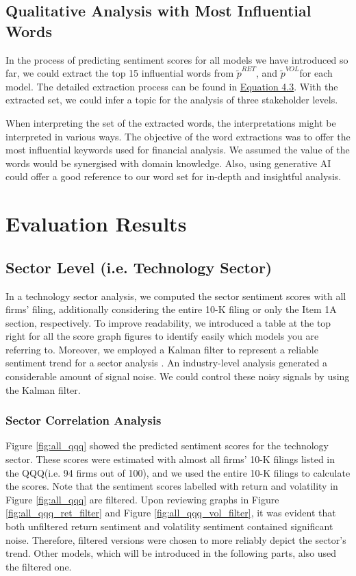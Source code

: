 \documentclass[logo,bsc,singlespacing,parskip]{infthesis}
\begin{document}
\subsection{Qualitative Analysis with Most Influential Words}
In the process of predicting sentiment scores for all models we have introduced so far, we could extract the top 15 influential words from $\tilde{p}^{RET}$, and  $\tilde{p}^{VOL}$for each model.
The detailed extraction process can be found in \hyperref[4.3]{Equation 4.3}. With the extracted set, we could infer a topic for the analysis of three stakeholder levels.

When interpreting the set of the extracted words, the interpretations might be interpreted in various ways. The objective of the word extractions was to offer the most influential keywords used for financial analysis. We assumed the value of the words would be synergised with domain knowledge. Also, using generative AI could offer a good reference to our word set for in-depth and insightful analysis. 

\section{Evaluation Results}

\subsection{Sector Level (i.e. Technology Sector)}
In a technology sector analysis, we computed the sector sentiment scores with all firms’ filing, additionally considering the entire 10-K filing or only the Item 1A section, respectively. To improve readability, we introduced a table at the top right for all the score graph figures to identify easily which models you are referring to. Moreover, we employed a Kalman filter to represent a reliable sentiment trend for a sector analysis \cite{durbin2012time}. An industry-level analysis generated a considerable amount of signal noise. We could control these noisy signals by using the Kalman filter.

\subsubsection{Sector Correlation Analysis}


Figure \ref{fig:all_qqq} showed the predicted sentiment scores for the technology sector. These scores were estimated with almost all firms’ 10-K filings listed in the QQQ(i.e. 94 firms out of 100), and we used the entire 10-K filings to calculate the scores. Note that the sentiment scores labelled with return and volatility in Figure \ref{fig:all_qqq} are filtered. Upon reviewing graphs in Figure \ref{fig:all_qqq_ret_filter} and Figure \ref{fig:all_qqq_vol_filter}, it was evident that both unfiltered return sentiment and volatility sentiment contained significant noise. Therefore, filtered versions were chosen to more reliably depict the sector's trend. Other models, which will be introduced in the following parts, also used the filtered one. 
\end{document}
